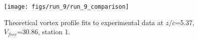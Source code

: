 \begin{figure}[H]
\centering
\texttt{[image: figs/run\_9/run\_9\_comparison]}
\caption{Theoretical vortex profile fits to experimental data at $z/c$=5.37, $V_{free}$=30.86, station 1.}
\label{fig:run_9_comparison}
\end{figure}


